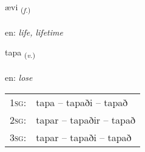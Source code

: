 \documentclass[frontgrid, backgrid]{flacards}\usepackage[]{graphicx}\usepackage[]{color}
\begin{document}
\renewcommand{\flhead}{\vskip5pt \fboxsep=0pt {\small\bfseries\footnotesize Nafnorð | Noun}}
\renewcommand{\fcfoot}{\vskip5pt \fboxsep=0pt \hspace{2pt}{\small\bfseries\footnotesize 2K}}

\renewcommand{\blhead}{\vskip5pt {\small\bfseries\footnotesize Nafnorð | Noun }}
\renewcommand{\bcfoot}{\vskip5pt \hspace{2pt}{\small\bfseries\footnotesize 2K}}


{ævi \small{\textsubscript{(\textit{f.})}} \\[1ex] %
\textphonetic{[aiːvɪ]} \\
en: \emph{life, lifetime} \\  [2ex]
\renewcommand*{\arraystretch}{0.8}
}

\renewcommand{\flhead}{\vskip5pt \fboxsep=0pt {\small\bfseries\footnotesize Sagnorð | Verb}}
\renewcommand{\fcfoot}{\vskip5pt \fboxsep=0pt \hspace{2pt}{\small\bfseries\footnotesize 2K}}

\renewcommand{\blhead}{\vskip5pt {\small\bfseries\footnotesize Sagnorð | Verb }}
\renewcommand{\bcfoot}{\vskip5pt \hspace{2pt}{\small\bfseries\footnotesize 2K}}


{tapa \small{\textsubscript{(\textit{v.})}} \\[1ex] %
\textphonetic{[tʰaːpa]} \\
en: \emph{lose} \\  [2ex]
\renewcommand*{\arraystretch}{0.8}
\begin{tabular}{p{1cm}l}
\textsc{1sg}: & tapa -- tapaði -- tapað \\ 
\textsc{2sg}: & tapar -- tapaðir -- tapað \\ 
\textsc{3sg}: & tapar -- tapaði -- tapað \\ 
\end{tabular}
}
\end{document}
